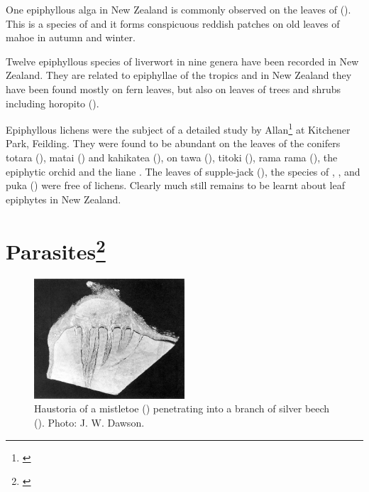 One epiphyllous alga in New Zealand is commonly observed on the leaves of  ().
This is a species of  and it forms conspicuous reddish patches on old leaves of mahoe in autumn and winter.

Twelve epiphyllous species of liverwort in nine genera have been recorded in New Zealand.
They are related to epiphyllae of the tropics and in New Zealand they have been found mostly on fern leaves, but also on leaves of trees and shrubs including horopito ().

Epiphyllous lichens were the subject of a detailed study by Allan\footnote{\cite{zahlbruckner1928epiphyllous}} at Kitchener Park, Feilding.
They were found to be abundant on the leaves of the conifers totara (), matai () and kahikatea (), on tawa (), titoki (), rama rama (), the epiphytic orchid  and the liane .
The leaves of supple-jack (), the species of , ,  and puka () were free of lichens.
Clearly much still remains to be learnt about leaf epiphytes in New Zealand.

\section[Parasites]{Parasites\footnote{\cite{fineran1974parasitic}}}

\begin{figure}
	\includegraphics[width=0.5\textwidth]{graphics/figure57mistletoe-haustoria.jpg}
	\centering
	\caption[Haustoria of a mistletoe]{Haustoria of a mistletoe () penetrating into a branch of silver beech ().
	Photo: J. W. Dawson.}
	\label{fig:57mistletoe-haustori}
\end{figure}

